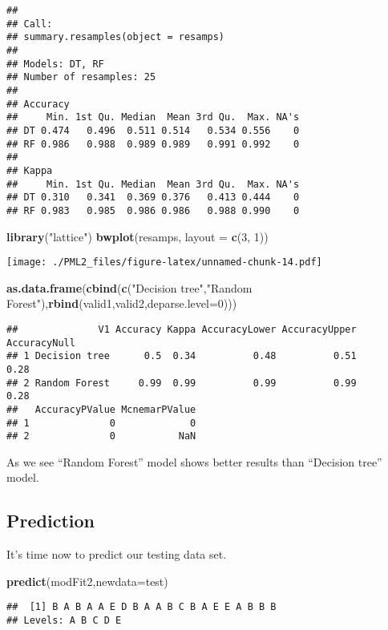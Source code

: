 \documentclass[]{article}
\newenvironment{Shaded}{\begin{snugshade}}{\end{snugshade}}
\newcommand{\KeywordTok}[1]{\textcolor[rgb]{0.13,0.29,0.53}{\textbf{{#1}}}}
\newcommand{\DataTypeTok}[1]{\textcolor[rgb]{0.13,0.29,0.53}{{#1}}}
\newcommand{\DecValTok}[1]{\textcolor[rgb]{0.00,0.00,0.81}{{#1}}}
\newcommand{\StringTok}[1]{\textcolor[rgb]{0.31,0.60,0.02}{{#1}}}
\newcommand{\NormalTok}[1]{{#1}}
\begin{document}
\begin{verbatim}
## 
## Call:
## summary.resamples(object = resamps)
## 
## Models: DT, RF 
## Number of resamples: 25 
## 
## Accuracy 
##     Min. 1st Qu. Median  Mean 3rd Qu.  Max. NA's
## DT 0.474   0.496  0.511 0.514   0.534 0.556    0
## RF 0.986   0.988  0.989 0.989   0.991 0.992    0
## 
## Kappa 
##     Min. 1st Qu. Median  Mean 3rd Qu.  Max. NA's
## DT 0.310   0.341  0.369 0.376   0.413 0.444    0
## RF 0.983   0.985  0.986 0.986   0.988 0.990    0
\end{verbatim}

\begin{Shaded}
\begin{Highlighting}[]
\KeywordTok{library}\NormalTok{(}\StringTok{"lattice"}\NormalTok{)}
\KeywordTok{bwplot}\NormalTok{(resamps, }\DataTypeTok{layout =} \KeywordTok{c}\NormalTok{(}\DecValTok{3}\NormalTok{, }\DecValTok{1}\NormalTok{))}
\end{Highlighting}
\end{Shaded}

\texttt{[image: ./PML2\_files/figure-latex/unnamed-chunk-14.pdf]}

\begin{Shaded}
\begin{Highlighting}[]
\KeywordTok{as.data.frame}\NormalTok{(}\KeywordTok{cbind}\NormalTok{(}\KeywordTok{c}\NormalTok{(}\StringTok{"Decision tree"}\NormalTok{,}\StringTok{"Random Forest"}\NormalTok{),}\KeywordTok{rbind}\NormalTok{(valid1,valid2,}\DataTypeTok{deparse.level=}\DecValTok{0}\NormalTok{)))}
\end{Highlighting}
\end{Shaded}

\begin{verbatim}
##              V1 Accuracy Kappa AccuracyLower AccuracyUpper AccuracyNull
## 1 Decision tree      0.5  0.34          0.48          0.51         0.28
## 2 Random Forest     0.99  0.99          0.99          0.99         0.28
##   AccuracyPValue McnemarPValue
## 1              0             0
## 2              0           NaN
\end{verbatim}

As we see ``Random Forest'' model shows better results than ``Decision
tree'' model.

\subsection{Prediction}\label{prediction}

It's time now to predict our testing data set.

\begin{Shaded}
\begin{Highlighting}[]
\KeywordTok{predict}\NormalTok{(modFit2,}\DataTypeTok{newdata=}\NormalTok{test)}
\end{Highlighting}
\end{Shaded}

\begin{verbatim}
##  [1] B A B A A E D B A A B C B A E E A B B B
## Levels: A B C D E
\end{verbatim}
\end{document}
